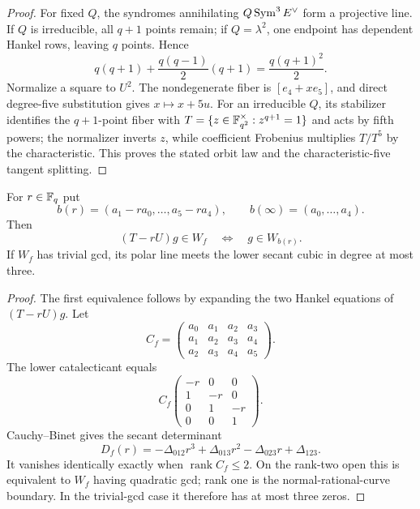 \begin{proof}
For fixed $Q$, the syndromes annihilating
$Q\operatorname{Sym}^3E^\vee$ form a projective line.  If $Q$ is irreducible, all
$q+1$ points remain; if $Q=\lambda^2$, one endpoint has dependent
Hankel rows, leaving $q$ points.  Hence
\[
 q(q+1)+\frac{q(q-1)}2(q+1)=\frac{q(q+1)^2}{2}.
\]
Normalize a square to $U^2$.  The nondegenerate fiber is
$[e_4+xe_5]$, and direct degree-five substitution gives
$x\mapsto x+5u$.  For an irreducible $Q$, its stabilizer identifies
the $q+1$-point fiber with
$T=\{z\in\mathbb F_{q^2}^\times:z^{q+1}=1\}$ and acts by fifth powers; the
normalizer inverts $z$, while coefficient Frobenius multiplies
$T/T^5$ by the characteristic.  This proves the stated orbit law and
the characteristic-five tangent splitting.
\end{proof}

\begin{proposition}
\label{prop:r6-secant}%
%
%
For $r\in\mathbb F_q$ put
\[
 b(r)=(a_1-ra_0,\ldots,a_5-ra_4),\qquad
 b(\infty)=(a_0,\ldots,a_4).
\]
Then
\[
 (T-rU)g\in W_f\quad\Longleftrightarrow\quad g\in W_{b(r)}.
\]
If $W_f$ has trivial gcd, its polar line meets the lower secant cubic
in degree at most three.
\end{proposition}

\begin{proof}
The first equivalence follows by expanding the two Hankel equations of
$(T-rU)g$.  Let
\[
C_f=\begin{pmatrix}
a_0&a_1&a_2&a_3\\
a_1&a_2&a_3&a_4\\
a_2&a_3&a_4&a_5
\end{pmatrix}.
\]
The lower catalecticant equals
\[
C_f\begin{pmatrix}
-r&0&0\\1&-r&0\\0&1&-r\\0&0&1
\end{pmatrix}.
\]
Cauchy--Binet gives the secant determinant
\[
D_f(r)=-\Delta_{012}r^3+\Delta_{013}r^2
       -\Delta_{023}r+\Delta_{123}.
\]
It vanishes identically exactly when $\operatorname{rank}C_f\leq2$.  On the
rank-two open this is equivalent to $W_f$ having quadratic gcd; rank one is
the normal-rational-curve boundary.  In the trivial-gcd case it therefore has
at most three zeros.
\end{proof}

